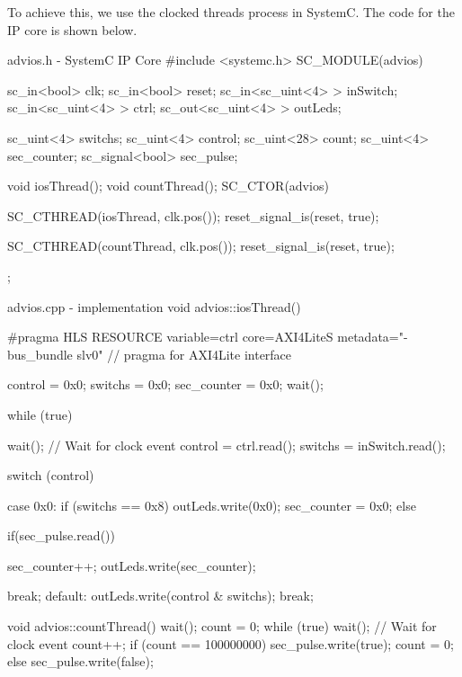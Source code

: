 \documentclass[../main.tex]{subfiles}
\begin{document}
To achieve this, we use the clocked threads process in SystemC. The code for the IP core is shown below.
\begin{myminted}{advios.h - SystemC IP Core}
    #include <systemc.h>
    SC_MODULE(advios){
        sc_in<bool> clk;
        sc_in<bool> reset;
        sc_in<sc_uint<4> > inSwitch;
        sc_in<sc_uint<4> > ctrl;
        sc_out<sc_uint<4> > outLeds;
    
        sc_uint<4> switchs;
        sc_uint<4> control;
        sc_uint<28> count;
        sc_uint<4> sec_counter;
        sc_signal<bool> sec_pulse;
    
        void iosThread();
        void countThread();
        SC_CTOR(advios){
            SC_CTHREAD(iosThread, clk.pos());
            reset_signal_is(reset, true);
    
            SC_CTHREAD(countThread, clk.pos());
            reset_signal_is(reset, true);
        }
    };
\end{myminted}
\begin{myminted}{advios.cpp - implementation}
    void advios::iosThread() {
    #pragma HLS RESOURCE variable=ctrl core=AXI4LiteS metadata="-bus_bundle slv0" // pragma for AXI4Lite interface
    
        control = 0x0;
        switchs = 0x0;
        sec_counter = 0x0;
        wait();
    
        while (true) {
            wait(); // Wait for clock event
            control = ctrl.read();
            switchs = inSwitch.read();
    
            switch (control){
                case 0x0:
                    if (switchs == 0x8) {
                        outLeds.write(0x0);
                        sec_counter = 0x0;
                    }else{
                        if(sec_pulse.read()){
        
                            sec_counter++;
                            outLeds.write(sec_counter);
                        }
                    }
                    break;
                default:
                    outLeds.write(control & switchs);
                    break;
            }
        }
    }
    void advios::countThread() {
        wait();
        count = 0;
        while (true) {
            wait();  // Wait for clock event
            count++;
            if (count == 100000000) {
                sec_pulse.write(true);
                count = 0;
            } else {
                sec_pulse.write(false);
            }
        }
    }
\end{myminted}
\end{document}
